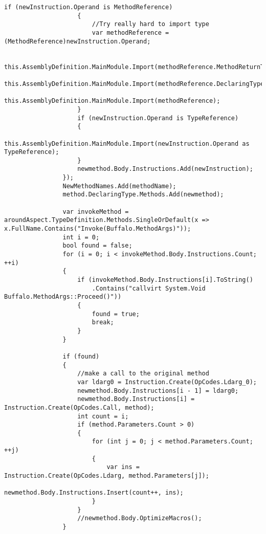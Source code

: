 \begin{lstlisting}[caption={../buffalo/Weaver.cs}, label=../buffalo/Weaver.cs, frame=tb, basicstyle=\scriptsize]
                    if (newInstruction.Operand is MethodReference)
                    {
                        //Try really hard to import type
                        var methodReference = (MethodReference)newInstruction.Operand;

                        this.AssemblyDefinition.MainModule.Import(methodReference.MethodReturnType.ReturnType);
                        this.AssemblyDefinition.MainModule.Import(methodReference.DeclaringType);
                        this.AssemblyDefinition.MainModule.Import(methodReference);
                    }
                    if (newInstruction.Operand is TypeReference)
                    {
                        this.AssemblyDefinition.MainModule.Import(newInstruction.Operand as TypeReference);
                    }
                    newmethod.Body.Instructions.Add(newInstruction);
                });
                NewMethodNames.Add(methodName);
                method.DeclaringType.Methods.Add(newmethod);

                var invokeMethod = aroundAspect.TypeDefinition.Methods.SingleOrDefault(x => x.FullName.Contains("Invoke(Buffalo.MethodArgs)"));
                int i = 0;
                bool found = false;
                for (i = 0; i < invokeMethod.Body.Instructions.Count; ++i)
                {
                    if (invokeMethod.Body.Instructions[i].ToString()
                        .Contains("callvirt System.Void Buffalo.MethodArgs::Proceed()"))
                    {
                        found = true;
                        break;
                    }
                }

                if (found)
                {
                    //make a call to the original method
                    var ldarg0 = Instruction.Create(OpCodes.Ldarg_0);
                    newmethod.Body.Instructions[i - 1] = ldarg0;
                    newmethod.Body.Instructions[i] = Instruction.Create(OpCodes.Call, method);
                    int count = i;
                    if (method.Parameters.Count > 0)
                    {
                        for (int j = 0; j < method.Parameters.Count; ++j)
                        {
                            var ins = Instruction.Create(OpCodes.Ldarg, method.Parameters[j]);
                            newmethod.Body.Instructions.Insert(count++, ins);
                        }
                    }
                    //newmethod.Body.OptimizeMacros();
                }


\end{lstlisting}
